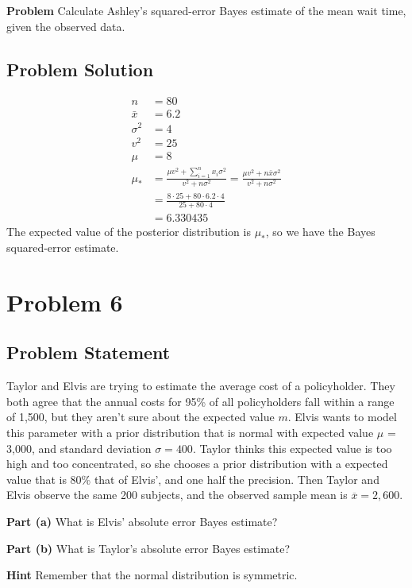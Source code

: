 \documentclass[12pt]{article}
\theoremstyle{definition}
\begin{document}
\bigskip
\noindent
{\bf Problem} Calculate Ashley's squared-error Bayes estimate of the mean wait time, given the observed data.


\subsection*{Problem Solution}
\begin{align*}
n &= 80\\
\bar{x} &= 6.2\\
\sigma^2 &= 4\\
v^2 &= 25\\
\mu &= 8\\
\mu_{*} &= \frac{\mu v^2 + \sum_{i=1}^n x_i \sigma^2}{v^2 + n\sigma^2} = \frac{\mu v^2 + n \bar{x}\sigma^2}{v^2 + n\sigma^2}\\
&= \frac{8 \cdot 25 + 80 \cdot 6.2 \cdot 4}{25 + 80 \cdot 4}\\
&= 6.330435
\end{align*}
The expected value of the posterior distribution is $\mu_*$, so we have the Bayes squared-error estimate.


\newpage
\section*{Problem 6}

\subsection*{Problem Statement}

Taylor and Elvis are trying to estimate the average cost of a policyholder. They both agree that the annual costs for 95\% of all policyholders fall within a range of 1,500, but they aren't sure about the expected value $m$. Elvis wants to model this parameter with a prior distribution that is normal with expected value $\mu$ = 3,000, and standard deviation $\sigma = 400$. Taylor thinks this expected value is too high and too concentrated, so she chooses a prior distribution with a expected value that is 80\% that of Elvis', and one half the precision. Then Taylor and Elvis observe the same 200 subjects, and the observed sample mean is $\overline{x} = 2,600$.

\bigskip
\noindent
{\bf Part (a)} What is Elvis' absolute error Bayes estimate?

\bigskip
\noindent
{\bf Part (b)} What is Taylor's absolute error Bayes estimate?

\bigskip
\noindent
{\bf Hint} Remember that the normal distribution is symmetric.
\end{document}

